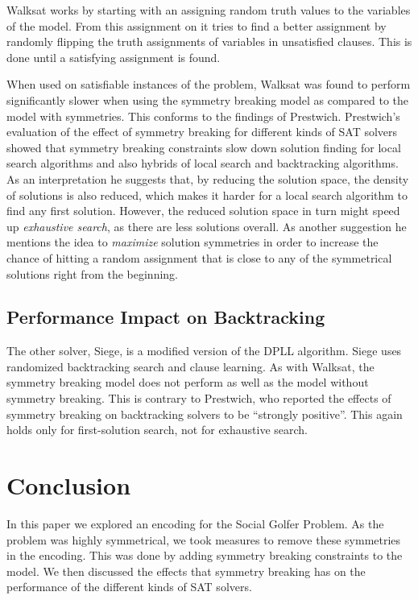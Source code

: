 \documentclass[a4paper]{scrartcl}
\begin{document}
Walksat works by starting with an assigning random truth values to the variables of the model. From this assignment on it tries to find a better assignment by randomly flipping the truth assignments of variables in unsatisfied clauses. This is done until a satisfying assignment is found.

When used on satisfiable instances of the problem, Walksat was found to perform significantly slower when using the symmetry breaking model as compared to the model with symmetries. This conforms to the findings of Prestwich\cite{Prestwich}. Prestwich's evaluation of the effect of symmetry breaking for different kinds of SAT solvers showed that symmetry breaking constraints slow down solution finding for local search algorithms and also hybrids of local search and backtracking algorithms. As an interpretation he suggests that, by reducing the solution space, the density of solutions is also reduced, which makes it harder for a local search algorithm to find any first solution. However, the reduced solution space in turn might speed up \emph{exhaustive search}, as there are less solutions overall. As another suggestion he mentions the idea to \emph{maximize} solution symmetries in order to increase the chance of hitting a random assignment that is close to any of the symmetrical solutions right from the beginning.


\subsection{Performance Impact on Backtracking}

The other solver, Siege, is a modified version of the DPLL algorithm\cite{DPLL}. Siege uses randomized backtracking search and clause learning. As with Walksat, the symmetry breaking model does not perform as well as the model without symmetry breaking. This is contrary to Prestwich, who reported the effects of symmetry breaking on backtracking solvers to be ``strongly positive''\cite{Prestwich}. This again holds only for first-solution search, not for exhaustive search.


\section{Conclusion}

In this paper we explored an encoding for the Social Golfer Problem. As the problem was highly symmetrical, we took measures to remove these symmetries in the encoding. This was done by adding symmetry breaking constraints to the model. We then discussed the effects that symmetry breaking has on the performance of the different kinds of SAT solvers.
\end{document}
